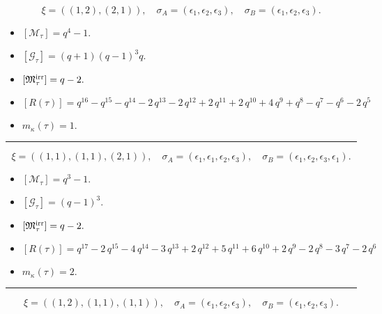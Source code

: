 \documentclass[10pt,a4paper]{amsart}
\begin{document}
$$\xi = ({(1, 2)}, {(2, 1)}),\quad \sigma_A = ({{\epsilon_1}}, {{\epsilon_2, \epsilon_3}}),\quad \sigma_B = ({{\epsilon_1}}, {{\epsilon_2, \epsilon_3}}).$$

\begin{itemize}
 \item $[\mathcal{M}_{\tau}] = q^{4} - 1 .$

 \item $[\mathcal{G}_{\tau}] = {\left(q + 1\right)} {\left(q - 1\right)}^{3} q .$

 \item $[{\frak M}_{\tau}^{\textrm{irr}}] = q - 2 .$

 \item $[R(\tau)] = q^{16} - q^{15} - q^{14} - 2 \, q^{13} - 2 \, q^{12} + 2 \, q^{11} + 2 \, q^{10} + 4 \, q^{9} + q^{8} - q^{7} - q^{6} - 2 \, q^{5} $

 \item $m_{\kappa}(\tau) = 1 .$

 \end{itemize}
\noindent\rule{8cm}{0.4pt}

$$\xi = ({(1, 1), (1, 1)}, {(2, 1)}),\quad \sigma_A = ({{\epsilon_1}, {\epsilon_1}}, {{\epsilon_2, \epsilon_3}}),\quad \sigma_B = ({{\epsilon_1}, {\epsilon_2}}, {{\epsilon_3, \epsilon_1}}).$$

\begin{itemize}
 \item $[\mathcal{M}_{\tau}] = q^{3} - 1 .$

 \item $[\mathcal{G}_{\tau}] = {\left(q - 1\right)}^{3} .$

 \item $[{\frak M}_{\tau}^{\textrm{irr}}] = q - 2 .$

 \item $[R(\tau)] = q^{17} - 2 \, q^{15} - 4 \, q^{14} - 3 \, q^{13} + 2 \, q^{12} + 5 \, q^{11} + 6 \, q^{10} + 2 \, q^{9} - 2 \, q^{8} - 3 \, q^{7} - 2 \, q^{6} $

 \item $m_{\kappa}(\tau) = 2 .$

 \end{itemize}
\noindent\rule{8cm}{0.4pt}

$$\xi = ({(1, 2)}, {(1, 1), (1, 1)}),\quad \sigma_A = ({{\epsilon_1}}, {{\epsilon_2}, {\epsilon_3}}),\quad \sigma_B = ({{\epsilon_1}}, {{\epsilon_2}, {\epsilon_3}}).$$
\end{document}

